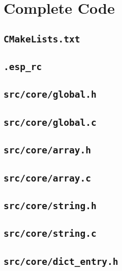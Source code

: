 \documentclass[../main.tex]{subfiles}
\begin{document}
\section{Complete Code}

\secttoc

\subsection{\texttt{CMakeLists.txt}}


\subsection{\texttt{.esp\_rc}}


\subsection{\texttt{src/core/global.h}}


\subsection{\texttt{src/core/global.c}}


\subsection{\texttt{src/core/array.h}}


\subsection{\texttt{src/core/array.c}}


\subsection{\texttt{src/core/string.h}}


\subsection{\texttt{src/core/string.c}}


\subsection{\texttt{src/core/dict\_entry.h}}

\end{document}
